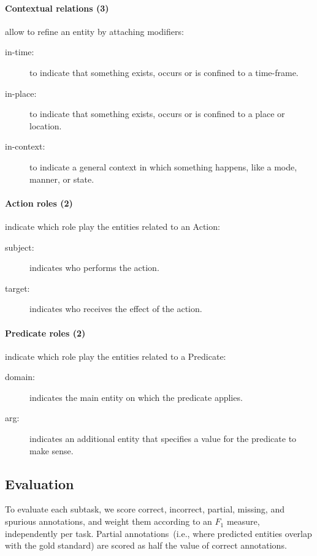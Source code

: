 \documentclass[a4paper,11pt,twocolumn,twoside]{article}
\begin{document}
\paragraph{Contextual relations (3)} allow to refine an entity by attaching modifiers:

\begin{description}
  \item[in-time:] to indicate that something exists, occurs or is confined to a time-frame.
  \item[in-place:] to indicate that something exists, occurs or is confined to a place or location.
  \item[in-context:] to indicate a general context in which something happens, like a mode, manner, or state.
\end{description}

\paragraph{Action roles (2)} indicate which role play the entities related to an Action:

\begin{description}
  \item[subject:] indicates who performs the action.
  \item[target:] indicates who receives the effect of the action.
\end{description}

\paragraph{Predicate roles (2)} indicate which role play the entities related to a Predicate:

\begin{description}
  \item[domain:] indicates the main entity on which the predicate applies.
  \item[arg:] indicates an additional entity that specifies a value for the predicate to make sense.
\end{description}

\subsection{Evaluation}

To evaluate each subtask, we score correct, incorrect, partial, missing, and spurious
annotations, and weight them according to an $F_1$ measure, independently per task.
Partial annotations~(i.e., where predicted entities overlap with the gold standard) are scored as half the value of correct annotations.
\end{document}
